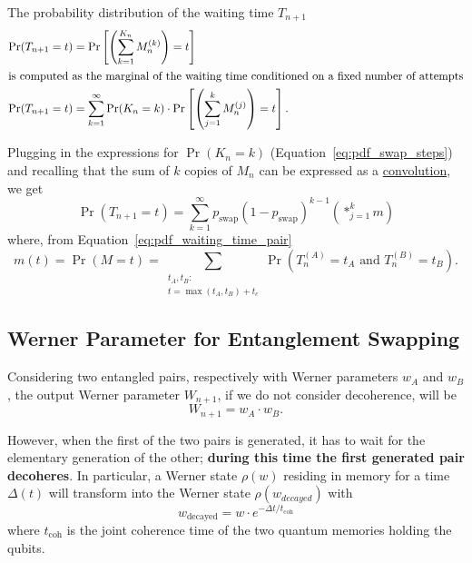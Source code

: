 \documentclass{masterthesis}
\begin{document}
The probability distribution of the waiting time $T_{n+1}$
\begin{align}
    \Pr(T_{n+1} = t) &= \Pr\left[\left(\sum_{k=1}^{K_{n}} M_{n}^{(k)}\right) = t\right] \nonumber \\
    \intertext{is computed as the marginal of the waiting time conditioned on a fixed number of attempts}
    \Pr(T_{n+1} = t) &= \sum_{k=1}^{\infty} \Pr(K_{n} = k) \cdot \Pr\left[\left( \sum_{j=1}^{k} M_{n}^{(j)} \right) = t\right].
\end{align}

Plugging in the expressions for $\Pr(K_n = k)$ (Equation~\ref{eq:pdf_swap_steps}) and recalling that the sum of $k$ copies of $M_n$ can be expressed as a \hyperref[eq:convolution]{convolution}, we get
\begin{equation}\label{eq:waiting_time_swap}
    \Pr(T_{n+1} = t) = \sum_{k=1}^{\infty} p_{\text{swap}}{(1 - p_{\text{swap}})}^{k-1} \left( \ast_{j=1}^{k} m \right)
\end{equation}
where, from Equation~\ref{eq:pdf_waiting_time_pair}
\begin{equation}\label{eq:pdf_waiting_time_pair_convolution}
    m(t) = \Pr(M = t) = \sum_{\substack{t_A, t_B: \\ t = \max(t_A, t_B) + t_c}} \Pr(T_n^{(A)} = t_A \text{ and } T_n^{(B)} = t_B) .
\end{equation}

\subsection{Werner Parameter for Entanglement Swapping}

Considering two entangled pairs, respectively with Werner parameters $w_A$ and $w_B$, the output Werner parameter $W_{n+1}$, if we do not consider decoherence, will be %
\begin{equation}
    W_{n+1} = w_A \cdot w_B .
\end{equation}

However, when the first of the two pairs is generated, it has to wait for the elementary generation of the other; \textbf{during this time the first generated pair decoheres}. In particular, a Werner state $\rho(w)$ residing in memory for a time $\Delta(t)$ will transform into the Werner state $\rho(w_{decayed})$ with 
\begin{equation}\label{eq:w_decayed}
    w_{\text{decayed}} = w \cdot e^{-\Delta t / t_\text{coh}}
\end{equation}
where $t_\text{coh}$ is the joint coherence time of the two quantum memories holding the qubits. %
\end{document}

